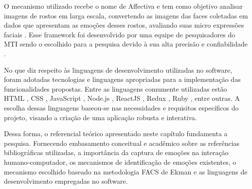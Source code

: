 O mecanismo utilizado recebe o nome de Affectiva \cite{8} e tem como objetivo analisar imagens de rostos em larga escala, convertendo as imagens das faces coletadas em dados que apresentam as emoções desses rostos, avaliando suas micro expressões faciais \cite{4}. Esse framework foi desenvolvido por uma equipe de pesquisadores do MTI \cite{8} sendo o escolhido para a pesquisa devido à sua alta precisão e confiabilidade \cite{9}\cite{10}.

No que diz respeito às linguagens de desenvolvimento utilizadas no software, foram adotadas tecnologias e linguagens apropriadas para a implementação das funcionalidades propostas. Entre as linguagens comumente utilizadas estão HTML \cite{11}, CSS \cite{12}, JavaScript \cite{13}, Node.js \cite{14}, ReactJS \cite{15}, Redux \cite{16}, Ruby \cite{17}, entre outras. A escolha dessas linguagens baseou-se nas necessidades e requisitos específicos do projeto, visando a criação de uma aplicação robusta e interativa.

Dessa forma, o referencial teórico apresentado neste capítulo fundamenta a pesquisa. Fornecendo embasamento conceitual e acadêmico sobre as referências bibliográficas utilizadas, a importância da captura de emoções na interação humano-computador, os mecanismos de identificação de emoções existentes, o mecanismo escolhido baseado na metodologia FACS de Ekman \cite{5} e as linguagens de desenvolvimento empregadas no software.
